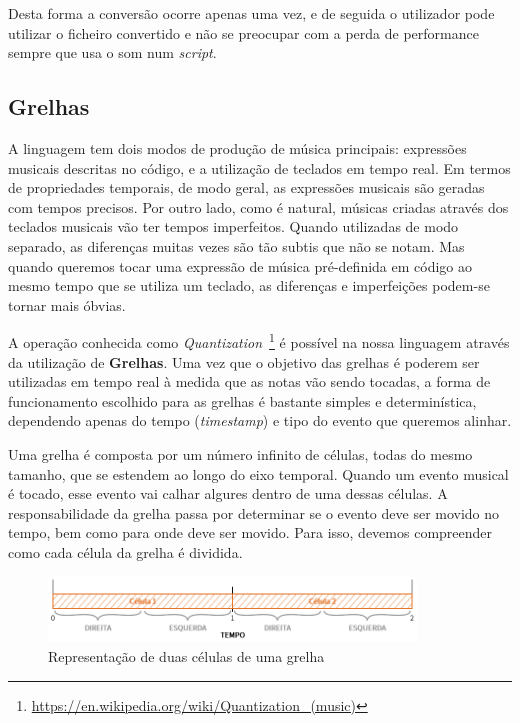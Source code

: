 Desta forma a conversão ocorre apenas uma vez, e de seguida o utilizador pode utilizar o ficheiro convertido e não se preocupar com a perda de performance sempre que usa o som num \textit{script}.

\subsection{Grelhas}
A linguagem tem dois modos de produção de música principais: expressões musicais descritas no código, e a utilização de teclados em tempo real. Em termos de propriedades temporais, de modo geral, as expressões musicais são geradas com tempos precisos. Por outro lado, como é natural, músicas criadas através dos teclados musicais vão ter tempos imperfeitos. Quando utilizadas de modo separado, as diferenças muitas vezes são tão subtis que não se notam. Mas quando queremos tocar uma expressão de música pré-definida em código ao mesmo tempo que se utiliza um teclado, as diferenças e imperfeições podem-se tornar mais óbvias\cite{doi:10.1177/1029864913486793}.

A operação conhecida como \textit{Quantization}~\footnote{\url{https://en.wikipedia.org/wiki/Quantization_(music)}} é possível na nossa linguagem através da utilização de \textbf{Grelhas}. Uma vez que o objetivo das grelhas é poderem ser utilizadas em tempo real à medida que as notas vão sendo tocadas, a forma de funcionamento escolhido para as grelhas é bastante simples e determinística, dependendo apenas do tempo (\textit{timestamp}) e tipo do evento que queremos alinhar.

Uma grelha é composta por um número infinito de células, todas do mesmo tamanho, que se estendem ao longo do eixo temporal. Quando um evento musical é tocado, esse evento vai calhar algures dentro de uma dessas células. A responsabilidade da grelha passa por determinar se o evento deve ser movido no tempo, bem como para onde deve ser movido. Para isso, devemos compreender como cada célula da grelha é dividida.

\begin{figure}[h]
\begin{center}
    \includegraphics[width=0.87\textwidth]{img/grids_1.png}
\end{center}
\caption{Representação de duas células de uma grelha}
\label{fig:grids-1}
\end{figure}

